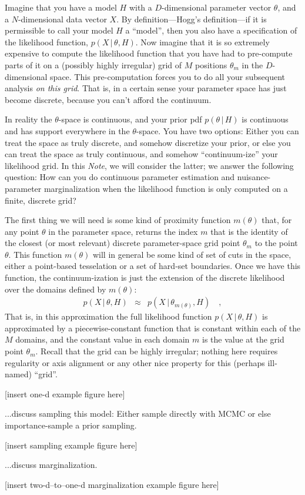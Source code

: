 \documentclass[12pt]{article}
\newcommand{\documentname}{\textsl{Note}}
\newcommand{\given}{\,|\,}
\begin{document}
Imagine that you have a model $H$ with a $D$-dimensional parameter vector $\theta$,
and a $N$-dimensional data vector $X$.
By definition---Hogg's definition---if it is permissible to call your model $H$
a ``model'', then you also have a specification of the likelihood function,
$p(X\given\theta, H)$.
Now imagine that it is so extremely expensive to compute the likelihood function that
you have had to pre-compute parts of it on a (possibly highly irregular)
grid of $M$ positions $\theta_m$ in the $D$-dimensional space.
This pre-computation forces you to do all your subsequent analysis
\emph{on this grid}.
That is, in a certain sense your parameter space has just become discrete,
because you can't afford the continuum.

In reality the $\theta$-space is continuous, and your prior pdf $p(\theta\given H)$
is continuous and has support everywhere in the $\theta$-space.
You have two options:
Either you can treat the space as truly discrete, and somehow discretize your prior,
or else you can treat the space as truly continuous, and somehow ``continuum-ize'' your likelihood grid.
In this \documentname, we will consider the latter; we answer the following question:
How can you do continuous parameter estimation and nuisance-parameter marginalization
when the likelihood function is only computed on a finite, discrete grid?

The first thing we will need is some kind of proximity function
$m(\theta)$ that, for any point $\theta$ in the parameter space,
returns the index $m$ that is the identity of the closest (or most
relevant) discrete parameter-space grid point $\theta_m$ to the point
$\theta$.  This function $m(\theta)$ will in general be some kind of
set of cuts in the space, either a point-based tesselation or a set of
hard-set boundaries.  Once we have this function, the
continuum-ization is just the extension of the discrete likelihood
over the domains defined by $m(\theta)$:
\begin{eqnarray}
p(X\given\theta, H)
 &\approx&
p(X\given\theta_{m(\theta)}, H)
\quad ,
\end{eqnarray}
That is, in this approximation the full likelihood function
$p(X\given\theta, H)$ is approximated by a piecewise-constant function
that is constant within each of the $M$ domains, and the constant
value in each domain $m$ is the value at the grid point $\theta_m$.
Recall that the grid can be highly irregular; nothing here requires
regularity or axis alignment or any other nice property for this
(perhaps ill-named) ``grid''.

[insert one-d example figure here]

...discuss sampling this model: Either sample directly with MCMC or
else importance-sample a prior sampling.

[insert sampling example figure here]

...discuss marginalization.

[insert two-d--to--one-d marginalization example figure here]
\end{document}
